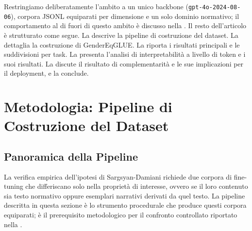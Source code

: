 \documentclass[pdflatex, sn-apa]{sn-jnl}%
\theoremstyle{thmstyleone}%
\theoremstyle{thmstyletwo}%
\theoremstyle{thmstylethree}%
\begin{document}
Restringiamo deliberatamente l'ambito a un unico backbone
(\texttt{gpt-4o-2024-08-06}), corpora JSONL equiparati per dimensione e un solo
dominio normativo; il comportamento al di fuori di questo ambito è discusso nella
. Il resto dell'articolo è strutturato come segue. La
 descrive la pipeline di costruzione del dataset. La
 dettaglia la costruzione di GenderEqGLUE. La
 riporta i risultati principali e le suddivisioni per task. La
 presenta l'analisi di interpretabilità a livello di token e i
suoi risultati. La
 discute il risultato di complementarità e le sue
implicazioni per il deployment, e la  conclude.

\section{Metodologia: Pipeline di Costruzione del Dataset}
\label{sec:method}

\subsection{Panoramica della Pipeline}
\label{sec:method:overview}

La verifica empirica dell'ipotesi di Sargsyan-Damiani richiede due corpora di
fine-tuning che differiscano solo nella proprietà di interesse, ovvero se il loro
contenuto sia testo normativo oppure esemplari narrativi derivati da quel testo.
La pipeline descritta in questa sezione è lo strumento procedurale che produce
questi corpora equiparati; è il prerequisito metodologico per il confronto
controllato riportato nella .
\end{document}
